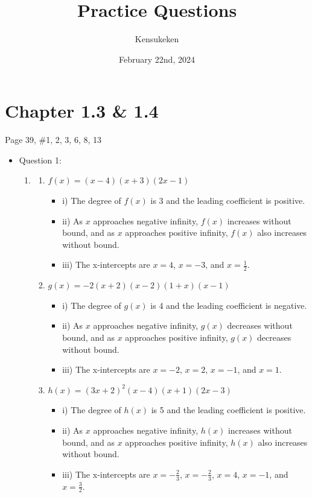 \documentclass{article}
\title{Practice Questions}
\author{Kensukeken}
\date{February 22nd, 2024}
\begin{document}
\maketitle
\section*{Chapter 1.3 \& 1.4}
Page 39, \#1, 2, 3, 6, 8, 13

\begin{itemize}
\item Question 1:
\begin{enumerate}
    \item 
    \begin{enumerate}
        \item $f(x) = (x - 4)(x + 3)(2x - 1)$
        \begin{itemize}
            \item i) The degree of $f(x)$ is 3 and the leading coefficient is positive.
            \item ii) As $x$ approaches negative infinity, $f(x)$ increases without bound, and as $x$ approaches positive infinity, $f(x)$ also increases without bound.
            \item iii) The x-intercepts are $x = 4$, $x = -3$, and $x = \frac{1}{2}$.
        \end{itemize}
        
        \item $g(x) = -2(x + 2)(x - 2)(1 + x)(x - 1)$
        \begin{itemize}
            \item i) The degree of $g(x)$ is 4 and the leading coefficient is negative.
            \item ii) As $x$ approaches negative infinity, $g(x)$ decreases without bound, and as $x$ approaches positive infinity, $g(x)$ decreases without bound.
            \item iii) The x-intercepts are $x = -2$, $x = 2$, $x = -1$, and $x = 1$.
        \end{itemize}
        
        \item $h(x) = (3x + 2)^2(x - 4)(x + 1)(2x - 3)$
        \begin{itemize}
            \item i) The degree of $h(x)$ is 5 and the leading coefficient is positive.
            \item ii) As $x$ approaches negative infinity, $h(x)$ increases without bound, and as $x$ approaches positive infinity, $h(x)$ also increases without bound.
            \item iii) The x-intercepts are $x = -\frac{2}{3}$, $x = -\frac{2}{3}$, $x = 4$, $x = -1$, and $x = \frac{3}{2}$.
        \end{itemize}
        

\end{enumerate}
\end{enumerate}
\end{itemize}
\end{document}
